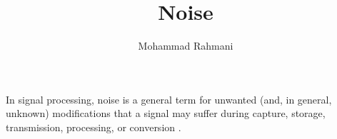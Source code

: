 \documentclass[a4paper]{article}
\title{Noise}
\date{}
\author{Mohammad Rahmani}
\begin{document}
   \maketitle

   In signal processing, noise is a general term for unwanted (and, in general, unknown) modifications that a signal may suffer during capture, storage, transmission, processing, or conversion .

   
   
\end{document}
